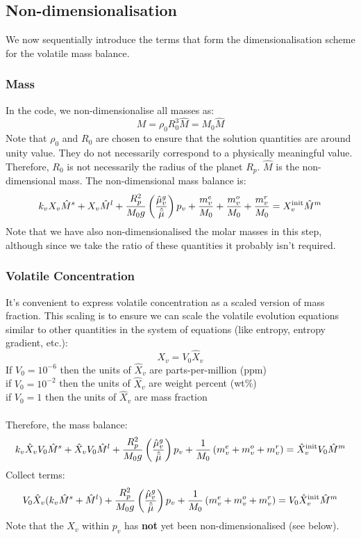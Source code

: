 \subsection{Non-dimensionalisation}
We now sequentially introduce the terms that form the dimensionalisation scheme for the volatile mass balance.
\subsubsection{Mass}
In the code, we non-dimensionalise all masses as:
\begin{equation}
M = \rho_0 R_0^3 \hat{M} = M_0 \hat{M}
\end{equation}
Note that $\rho_0$ and $R_0$ are chosen to ensure that the solution quantities are around unity value.  They do not necessarily correspond to a physically meaningful value.  Therefore, $R_0$ is not necessarily the radius of the planet $R_p$.  $\hat{M}$ is the non-dimensional mass.  The non-dimensional mass balance is:
\begin{equation}
k_v X_v \hat{M}^s + X_v \hat{M}^l + \frac{R_p^2}{M_0 g} \left( \frac{\hat{\mu}_v^g}{\hat{\bar{\mu}}} \right) p_v + \frac{m_v^e}{M_0} + \frac{m_v^o}{M_0} + \frac{m_v^r}{M_0} = X_v^{\rm init} \hat{M}^m
\end{equation}
Note that we have also non-dimensionalised the molar masses in this step, although since we take the ratio of these quantities it probably isn't required.
\subsubsection{Volatile Concentration}
It's convenient to express volatile concentration as a scaled version of mass fraction.  This scaling is to ensure we can scale the volatile evolution equations similar to other quantities in the system of equations (like entropy, entropy gradient, etc.):
\begin{equation}
X_v = V_0 \hat{X}_v
\end{equation}
If $V_0=10^{-6}$ then the units of $\hat{X}_v$ are parts-per-million (ppm)\\
if $V_0=10^{-2}$ then the units of $\hat{X}_v$ are weight percent (wt\%)\\
if $V_0=1$ then the units of $\hat{X}_v$ are mass fraction\\~\\
Therefore, the mass balance:
\begin{equation}
k_v \hat{X}_v V_0 \hat{M}^s + \hat{X}_v V_0 \hat{M}^l + \frac{R_p^2}{M_0 g} \left( \frac{\hat{\mu}_v^g}{\hat{\bar{\mu}}} \right) p_v + \frac{1}{M_0} \left( m_v^e + m_v^o + m_v^r \right) = \hat{X}_v^{\rm init} V_0 \hat{M}^m
\end{equation}
Collect terms:
\begin{equation}
V_0 \hat{X}_v (k_v \hat{M}^s + \hat{M}^l) + \frac{R_p^2}{M_0 g} \left( \frac{\hat{\mu}_v^g}{\hat{\bar{\mu}}} \right) p_v + \frac{1}{M_0} \left( m_v^e + m_v^o + m_v^r \right) = V_0 \hat{X}_v^{\rm init} \hat{M}^m
\end{equation}
Note that the $X_v$ within $p_v$ has \textbf{not} yet been non-dimensionalised (see below).
